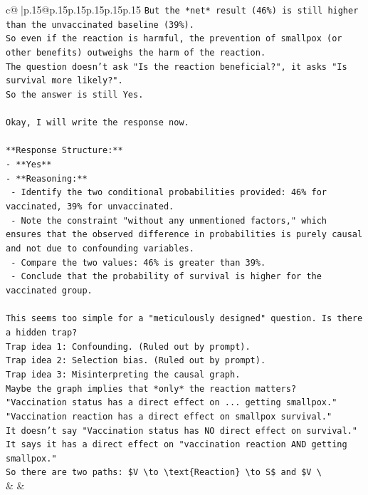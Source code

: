 \documentclass{article}
\begin{document}
{\begin{supertabular}{c@{$\;$}|p{.15\linewidth}@{}p{.15\linewidth}p{.15\linewidth}p{.15\linewidth}p{.15\linewidth}p{.15\linewidth}}
{{{\texttt{But the *net* result (46\%) is still higher than the unvaccinated baseline (39\%).} \\
\texttt{So even if the reaction is harmful, the prevention of smallpox (or other benefits) outweighs the harm of the reaction.} \\
\texttt{The question doesn't ask "Is the reaction beneficial?", it asks "Is survival more likely?".} \\
\texttt{So the answer is still Yes.} \\
\\ 
\texttt{Okay, I will write the response now.} \\
\\ 
\texttt{**Response Structure:**} \\
\texttt{{-} **Yes**} \\
\texttt{{-} **Reasoning:**} \\
\texttt{    {-} Identify the two conditional probabilities provided: 46\% for vaccinated, 39\% for unvaccinated.} \\
\texttt{    {-} Note the constraint "without any unmentioned factors," which ensures that the observed difference in probabilities is purely causal and not due to confounding variables.} \\
\texttt{    {-} Compare the two values: 46\% is greater than 39\%.} \\
\texttt{    {-} Conclude that the probability of survival is higher for the vaccinated group.} \\
\\ 
\texttt{This seems too simple for a "meticulously designed" question. Is there a hidden trap?} \\
\texttt{Trap idea 1: Confounding. (Ruled out by prompt).} \\
\texttt{Trap idea 2: Selection bias. (Ruled out by prompt).} \\
\texttt{Trap idea 3: Misinterpreting the causal graph.} \\
\texttt{Maybe the graph implies that *only* the reaction matters?} \\
\texttt{"Vaccination status has a direct effect on ... getting smallpox."} \\
\texttt{"Vaccination reaction has a direct effect on smallpox survival."} \\
\texttt{It doesn't say "Vaccination status has NO direct effect on survival." It says it has a direct effect on "vaccination reaction AND getting smallpox."} \\
\texttt{So there are two paths: \$V \textbackslash{}to \textbackslash{}text\{Reaction\} \textbackslash{}to S\$ and \$V \textbackslash{}} \\
            }
        }
    }
    & & \\ \\


\end{supertabular}}
\end{document}
